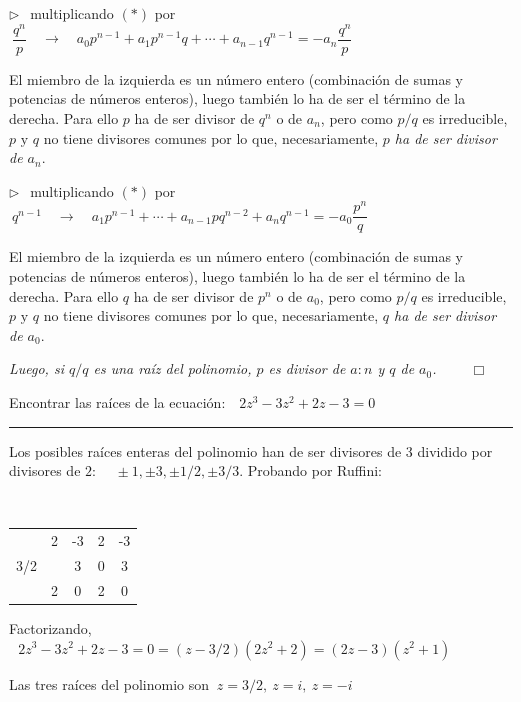 $\triangleright \ \ $ multiplicando $(*)$ por $\ \dfrac {q^n}{p} \quad \to \quad 
a_0p^{n-1}+a_1p^{n-1}q+\cdots +a_{n-1}q^{n-1}=-a_n \dfrac{q^n}{p}$

El miembro de la izquierda es un número entero (combinación de sumas y potencias de números enteros), luego también lo ha de ser el término de la derecha. Para ello $p$ ha de ser divisor de $q^n$ o de $a_n$, pero como $p/q$ es irreducible, $p \text{ y } q$ no tiene divisores comunes por lo que, necesariamente, \emph{$p$ ha de ser divisor de $a_n$}.

$\triangleright \ \ $ multiplicando $(*)$ por $\ q^{n-1} \quad \to \quad 
a_1p^{n-1}+\cdots +a_{n-1}pq^{n-2}+a_nq^{n-1}=-a_0 \dfrac{p^n}{q}$

El miembro de la izquierda es un número entero (combinación de sumas y potencias de números enteros), luego también lo ha de ser el término de la derecha. Para ello $q$ ha de ser divisor de $p^n$ o de $a_0$, pero como $p/q$ es irreducible, $p \text{ y } q$ no tiene divisores comunes por lo que, necesariamente, \emph{$q$ ha de ser divisor de $a_0$}.

\emph{Luego, si $q/q$ es una raíz del polinomio, $p$ es divisor de $a:n$ y $q$ de $a_0$. $\qquad \Box$}


\vspace{5mm}
\begin{miejercicio}

Encontrar las raíces de la ecuación:  $\ \ \ 2z^3-3z^2+2z-3=0$

\vspace{-2mm}
\rule{250pt}{0.1pt}


\begin{multicols}{2}

\begin{small}Los posibles raíces enteras del polinomio han de ser divisores de $3$ dividido por divisores de $2$: $\quad\pm 1, \pm 3, \pm 1/2, \pm 3/3$. Probando por Ruffini:\end{small}

$\quad$
\begin{table}[H]
\centering
\begin{tabular}{c|cccc}
    & 2 & -3 & 2                      & -3 \\
3/2 &   & 3  & 0                      & 3  \\ \hline
    & 2 & 0  & \multicolumn{1}{c|}{2} & 0  \\ \cline{5-5} 
\end{tabular}
\end{table}	
\end{multicols}
Factorizando,  $\ \ \ 2z^3-3z^2+2z-3=0=(z-3/2)(2z^2+2)=(2z-3)(z^2+1)$

Las tres raíces del polinomio son $\ z=3/2,\ z=i,\ z=-i$
\end{miejercicio}


